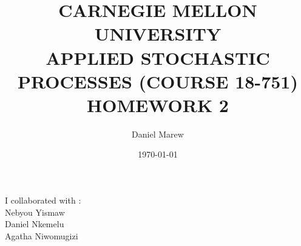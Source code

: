 \documentclass[a4paper,11pt]{article}
\begin{document}
\title{\color{red}CARNEGIE MELLON UNIVERSITY\\
APPLIED STOCHASTIC PROCESSES  (COURSE 18-751)\\
HOMEWORK 2}
\author{Daniel Marew}
\date{\today}
\clearpage\maketitle

\thispagestyle{empty}
\newpage
I collaborated with :\\
\hspace*{6cm}
Nebyou Yismaw\\
\hspace*{6cm}
Daniel    Nkemelu\\
\hspace*{6cm}
Agatha Niwomugizi
\thispagestyle{empty}
\newpage


\newpage
\clearpage
\setcounter{page}{1}
\end{document}
